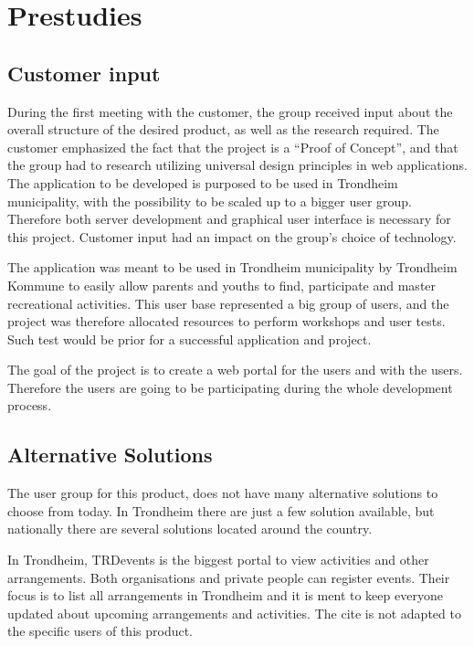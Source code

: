 
\chapter{Prestudies}


\section{Customer input}
During the first meeting with the customer, the group received input about the overall structure of the desired product, as well as the research required. The customer emphasized the fact that the project is a “Proof of Concept”, and that the group had to research utilizing universal design principles in web applications. The application to be developed is purposed to be used in Trondheim municipality, with the possibility to be scaled up to a bigger user group. Therefore both server development and graphical user interface is necessary for this project. Customer input had an impact on the group's choice of technology. 

The application was meant to be used in Trondheim municipality by Trondheim Kommune to easily allow parents and youths to find, participate and master recreational activities. This user base represented a big group of users, and the project was therefore allocated resources to perform workshops and user tests. Such test would be prior for a successful application and project. 

The goal of the project is to create a web portal for the users and with the users. Therefore the users are going to be participating during the whole development process.

\section{Alternative Solutions}
The user group for this product, does not have many alternative solutions to choose from today. In Trondheim there are just a few solution available, but nationally there are several solutions located around the country.

In Trondheim, TRDevents \cite{TRDevents} is the biggest portal to view activities and other arrangements. Both organisations and private people can register events. Their focus is to list all arrangements in Trondheim and it is ment to keep everyone updated about upcoming arrangements and activities. The cite is not adapted to the specific users of this product. 

